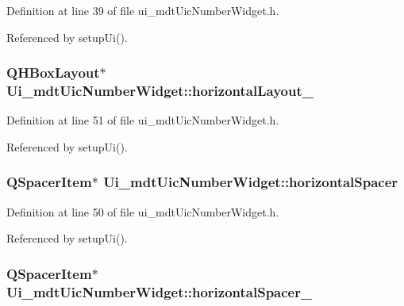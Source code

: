 Definition at line 39 of file ui\-\_\-mdt\-Uic\-Number\-Widget.\-h.



Referenced by setup\-Ui().

\hypertarget{class_ui__mdt_uic_number_widget_aa7c7cb7ee88ba5c8cbbefcaee910c634}{
\subsubsection[{horizontal\-Layout\-\_\-4}]{\setlength{\rightskip}{0pt plus 5cm}Q\-H\-Box\-Layout$\ast$ Ui\-\_\-mdt\-Uic\-Number\-Widget\-::horizontal\-Layout\-\_}}\label{class_ui__mdt_uic_number_widget_aa7c7cb7ee88ba5c8cbbefcaee910c634}


Definition at line 51 of file ui\-\_\-mdt\-Uic\-Number\-Widget.\-h.



Referenced by setup\-Ui().

\hypertarget{class_ui__mdt_uic_number_widget_ada767c7e3cc4d5bacc358e3ebf9b44f1}{
\subsubsection[{horizontal\-Spacer}]{\setlength{\rightskip}{0pt plus 5cm}Q\-Spacer\-Item$\ast$ Ui\-\_\-mdt\-Uic\-Number\-Widget\-::horizontal\-Spacer}}\label{class_ui__mdt_uic_number_widget_ada767c7e3cc4d5bacc358e3ebf9b44f1}


Definition at line 50 of file ui\-\_\-mdt\-Uic\-Number\-Widget.\-h.



Referenced by setup\-Ui().

\hypertarget{class_ui__mdt_uic_number_widget_a8d07dc54216bfe4d94ca6ba9bdf0058b}{
\subsubsection[{horizontal\-Spacer\-\_\-2}]{\setlength{\rightskip}{0pt plus 5cm}Q\-Spacer\-Item$\ast$ Ui\-\_\-mdt\-Uic\-Number\-Widget\-::horizontal\-Spacer\-\_}}\label{class_ui__mdt_uic_number_widget_a8d07dc54216bfe4d94ca6ba9bdf0058b}


